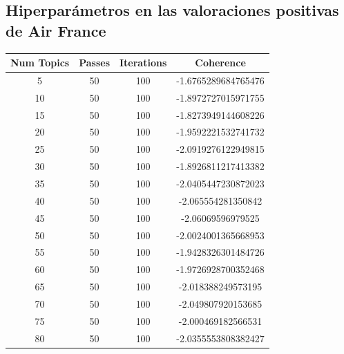 \documentclass{report}
\begin{document}
{            \clearpage\subsection{Hiperparámetros en las valoraciones positivas de Air France}
                \label{tab:hiperparametros_air_france_positivas}
                \begin{longtable}{|c|c|c|c|}
                    \hline
                    \textbf{Num Topics} & \textbf{Passes} & \textbf{Iterations} & \textbf{Coherence} \\
                    \hline
                    5 & 50 & 100 & -1.6765289684765476 \\
                    \hline
                    10 & 50 & 100 & -1.8972727015971755 \\
                    \hline
                    15 & 50 & 100 & -1.8273949144608226 \\
                    \hline
                    20 & 50 & 100 & -1.9592221532741732 \\
                    \hline
                    25 & 50 & 100 & -2.0919276122949815 \\
                    \hline
                    30 & 50 & 100 & -1.8926811217413382 \\
                    \hline
                    35 & 50 & 100 & -2.0405447230872023 \\
                    \hline
                    40 & 50 & 100 & -2.065554281350842 \\
                    \hline
                    45 & 50 & 100 & -2.06069596979525 \\
                    \hline
                    50 & 50 & 100 & -2.0024001365668953 \\
                    \hline
                    55 & 50 & 100 & -1.9428326301484726 \\
                    \hline
                    60 & 50 & 100 & -1.9726928700352468 \\
                    \hline
                    65 & 50 & 100 & -2.018388249573195 \\
                    \hline
                    70 & 50 & 100 & -2.049807920153685 \\
                    \hline
                    75 & 50 & 100 & -2.000469182566531 \\
                    \hline
                    80 & 50 & 100 & -2.0355553808382427 \\
                    \hline

\end{longtable}}
\end{document}
